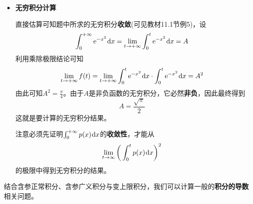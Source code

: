 \documentclass[a4paper,UTF8,fontset=windows,AutoFakeBold]{ctexart}
\newcommand*{\dr}{\hspace{0.07em}\mathrm{d}}
\newcommand*{\er}{\mathrm{e}}
\newcommand*{\note}{\noindent *}
\theoremstyle{ex}
\begin{document}
\begin{framed}
{\begin{itemize}
        \item \textbf{无穷积分计算}
        
        直接估算可知题中所求的无穷积分\textbf{收敛}(可见教材11.1节例5)，设
        $$\int_0^{+\infty}\er^{-x^2}\dr x=\lim_{t\to+\infty}\int_0^t\er^{-x^2}\dr x=A$$
        利用乘除极限结论可知
        $$\lim_{t\to+\infty}f(t)=\lim_{t\to+\infty}\int_0^t\er^{-x^2}\dr x\cdot\int_0^t\er^{-x^2}\dr x=A^2$$
        由此可知$A^2=\frac{\pi}{4}$。由于$A$是非负函数的无穷积分，它必然\textbf{非负}，因此最终得到
        $$A=\frac{\sqrt\pi}{2}$$
        这就是要计算的无穷积分结果。

        \note 注意必须先证明$\int_0^{+\infty}p(x)\dr x$的\textbf{收敛性}，才能从
        $$\lim_{t\to\infty}\bigg(\int_0^tp(x)\dr x\bigg)^2$$
        的极限中得到无穷积分的结果。
    \end{itemize}
}
\end{framed}

\note 结合含参正常积分、含参广义积分与变上限积分，我们可以计算一般的\textbf{积分的导数}相关问题。
\end{document}
